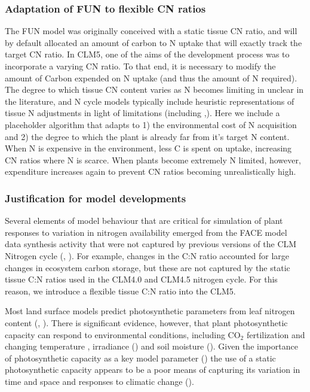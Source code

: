 \documentclass[draft,linenumbers]{agujournal}
\begin{document}
\subsubsection{Adaptation of FUN to flexible CN ratios}
The FUN model was originally conceived with a static tissue CN ratio, and will by default allocated an amount of carbon to N uptake that will exactly track the target CN ratio. In CLM5, one of the aims of the development process was to incorporate a varying CN ratio. To that end, it is necessary to modify the amount of Carbon expended on N uptake (and thus the amount of N required). The degree to which tissue CN content varies as N becomes limiting in unclear in the literature, and N cycle models typically include heuristic representations of tissue N adjustments in light of limitations (including \cite{zaehle2010},\cite{ghimire2016}). Here we include a placeholder algorithm that adapts to 1) the environmental cost of N acquisition and 2) the degree to which the plant is already far from it's target N content. When N is expensive in the environment, less C is spent on uptake, increasing CN ratios where N is scarce. When plants become extremely N limited, however, expenditure increases again to prevent CN ratios becoming unrealistically high.    

\subsubsection{Justification for model developments}
Several elements of model behaviour that are critical for simulation of plant responses to variation in nitrogen availability  emerged from the FACE model data synthesis activity that were not captured by previous versions of the CLM Nitrogen cycle (\cite{zaehle2014}, \cite{medlyn2015using}). For example, changes in the C:N ratio accounted for large changes in ecosystem carbon storage,  but these are not captured by the static tissue C:N ratios used in the CLM4.0 and CLM4.5 nitrogen cycle. For this reason, we introduce a flexible tissue C:N ratio into the CLM5. 

Most land surface models predict photosynthetic parameters from leaf nitrogen content (\cite{kattge2009}, \cite{bonan2012}). There is significant evidence, however, that plant photosynthetic capacity can respond to environmental conditions, including CO$_{2}$ fertilization \cite{ainsworth2007} and changing temperature \cite{hikosaka2005}, irradiance (\cite{niinemets1998}) and soil moisture (\cite{keenan2009}). Given the importance of photosynthetic capacity as a key model parameter (\cite{rogers2017}) the use of a static photosynthetic capacity appears to be a poor means of capturing its variation in time and space and responses to climatic change (\cite{walker2017}). 
\end{document}

